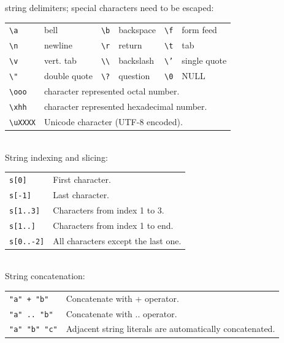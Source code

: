 string delimiters; special characters need to be escaped:\\
\setlength{\tabcolsep}{2mm}
\begin{tabular}{@{}llllll}
    \texttt{\textbackslash a} & bell & \texttt{\textbackslash b} & backspace & \texttt{\textbackslash f} & form feed \\
    \texttt{\textbackslash n} & newline & \texttt{\textbackslash r} & return & \texttt{\textbackslash t} & tab \\
    \texttt{\textbackslash v} & vert. tab & \texttt{\textbackslash\textbackslash} & backslash & \texttt{\textbackslash '} & single quote \\
    \texttt{\textbackslash "} & double quote & \texttt{\textbackslash ?} & question & \texttt{\textbackslash 0} & NULL \\
    \texttt{\textbackslash ooo} & \multicolumn{5}{l}{character represented octal number.} \\
    \texttt{\textbackslash xhh} & \multicolumn{5}{l}{character represented hexadecimal number.} \\
    \texttt{\textbackslash uXXXX} & \multicolumn{5}{l}{Unicode character (UTF-8 encoded).}
\end{tabular}\\

\hangpar String indexing and slicing:

\begin{tabular}{@{}lp{}}
\texttt{s[0]} & First character. \\
\texttt{s[-1]} & Last character. \\
\texttt{s[1..3]} & Characters from index 1 to 3. \\
\texttt{s[1..]} & Characters from index 1 to end. \\
\texttt{s[0..-2]} & All characters except the last one. \\
\end{tabular}\\

\hangpar String concatenation:

\begin{tabular}{@{}lp{}}
\texttt{"a" + "b"} & Concatenate with + operator. \\
\texttt{"a" .. "b"} & Concatenate with .. operator. \\
\texttt{"a" "b" "c"} & Adjacent string literals are automatically concatenated. \\
\end{tabular}\\

